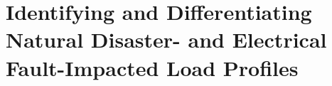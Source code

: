 \section{Identifying and Differentiating Natural Disaster- and Electrical Fault-Impacted Load Profiles}
\label{sec:identifying_and_differentiating_natural_disaster_and_electrical_fault_impacted_load_profiles}
